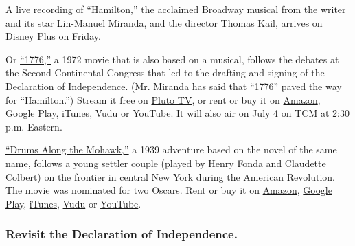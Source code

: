 A live recording of
\href{https://www.youtube.com/watch?v=DSCKfXpAGHc\&feature=youtu.be}{``Hamilton,''}
the acclaimed Broadway musical from the writer and its star Lin-Manuel
Miranda, and the director Thomas Kail, arrives on
\href{https://www.disneyplus.com/}{Disney Plus} on Friday.

Or \href{https://www.youtube.com/watch?v=iPS-P6yes8A}{``1776,''} a 1972
movie that is also based on a musical, follows the debates at the Second
Continental Congress that led to the drafting and signing of the
Declaration of Independence. (Mr. Miranda has said that ``1776''
\href{https://www.playbill.com/article/lin-manuel-miranda-and-william-daniels-talk-hamilton-1776-mr-feeny-and-more}{paved
the way} for ``Hamilton.'') Stream it free on
\href{https://pluto.tv/on-demand/movies/1776-1972-1-1?utm_medium=textsearch\&utm_source=google}{Pluto
TV}, or rent or buy it on
\href{https://www.amazon.com/gp/video/detail/amzn1.dv.gti.70a9f704-1468-1688-82f6-18d97d981c5a?autoplay=1\&ref_=atv_cf_strg_wb}{Amazon},
\href{https://play.google.com/store/movies/details?id=COGmVpHWr7s}{Google
Play},
\href{https://itunes.apple.com/us/movie/1776/id290547622}{iTunes},
\href{https://www.vudu.com/content/movies/details/1776-Directors-Cut/26381}{Vudu}
or \href{https://www.youtube.com/watch?v=COGmVpHWr7s}{YouTube}. It will
also air on July 4 on TCM at 2:30 p.m. Eastern.

\href{https://www.nytimes3xbfgragh.onion/1939/11/04/archives/the-screen-john-fords-film-of-drums-along-the-mohawk-opens-at-the.html}{``Drums
Along the Mohawk,''} a 1939 adventure based on the novel of the same
name, follows a young settler couple (played by Henry Fonda and
Claudette Colbert) on the frontier in central New York during the
American Revolution. The movie was nominated for two Oscars. Rent or buy
it on
\href{https://www.amazon.com/gp/video/detail/amzn1.dv.gti.2ea9f738-1788-4bcc-5070-04a9b242fad8?autoplay=1\&ref_=atv_cf_strg_wb}{Amazon},
\href{https://play.google.com/store/movies/details?id=iCw82SzUnBk}{Google
Play},
\href{https://itunes.apple.com/us/movie/drums-along-the-mohawk/id566992684}{iTunes},
\href{https://www.vudu.com/content/movies/details/Drums-Along-the-Mohawk/8506}{Vudu}
or \href{https://www.youtube.com/watch?v=iCw82SzUnBk}{YouTube}.

\hypertarget{revisit-the-declaration-of-independence}{%
\subsubsection{Revisit the Declaration of
Independence.}\label{revisit-the-declaration-of-independence}}

